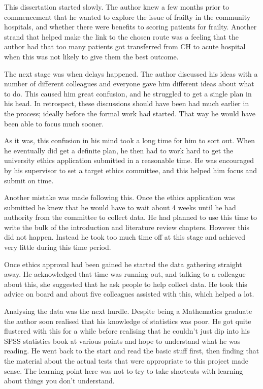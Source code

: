 \documentclass
[
	12pt,
	a4paper,
	oneside,
]{report}
\begin{document}
This dissertation started slowly. The author knew a few months prior to 
commencement that he wanted to explore the issue of frailty in the community
hospitals, and whether there were benefits to scoring patients for frailty.
Another strand that helped make the link to the chosen route was a feeling
that the author had that too many patients got transferred from CH to acute
hospital when this was not likely to give them the best outcome.

The next stage was when delays happened. The author discussed his ideas with
a number of different colleagues and everyone gave him different ideas about 
what to do. This caused him great confusion, and he struggled to get a single 
plan in his head. In retrospect, these discussions should have been had 
much earlier in the process; ideally before the formal work had started. That
way he would have been able to focus much sooner.

As it was, this confusion in his mind took a long time for him to sort out.
When he eventually did get a definite plan, he then had to work hard to get
the university ethics application submitted in a reasonable time. He was 
encouraged by his supervisor to set a target ethics committee, and this helped
him focus and submit on time. 

Another mistake was made following this. Once the ethics application was
submitted he knew that he would have to wait about 4 weeks until he had
authority from the committee to collect data. He had planned to use this time 
to write the bulk of the introduction and literature review chapters. However
this did not happen. Instead he took too much time off at this stage and
achieved very little during this time period. 

Once ethics approval had been gained he started the data gathering straight
away. He acknowledged that time was running out, and talking to a colleague 
about this, she suggested that he ask people to help collect data. He took
this advice on board and about five colleagues assisted with this, which
helped a lot.

Analysing the data was the next hurdle. Despite being a Mathematics graduate
the author soon realised that his knowledge of statistics was poor. He got 
quite flustered with this for a while before realising that he couldn't just
dip into his SPSS statistics book at various points and hope to understand
what he was reading. He went back to the start and read the basic stuff first,
then finding that the material about the actual tests that were appropriate to
this project made sense. The learning point here was not to try to take 
shortcuts with learning about things you don't understand.
\end{document}
